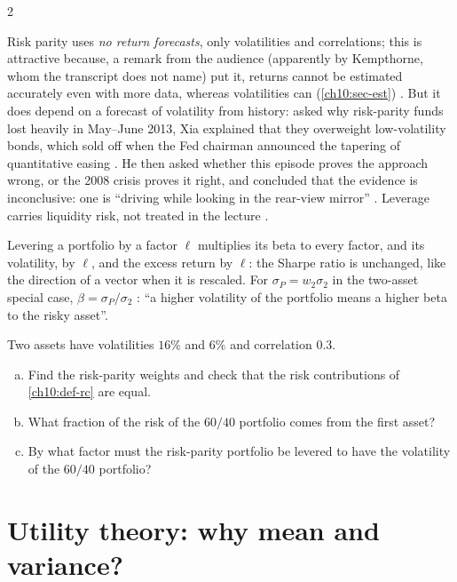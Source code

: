 \begin{paracol}{2}
\begin{finance}
Risk parity uses \emph{no return forecasts}, only volatilities and correlations; this is attractive because,
a remark from the audience (apparently by Kempthorne, whom the transcript does not name) put it, returns cannot be
estimated accurately even with more data, whereas volatilities can (\cref{ch10:sec-est}) . But it does depend on a forecast of volatility from history: asked why risk-parity
funds lost heavily in May--June 2013, Xia explained that they overweight low-volatility bonds, which sold off when
the Fed chairman announced the tapering of quantitative easing . He then asked whether this
episode proves the approach wrong, or the 2008 crisis proves it right, and concluded that the evidence is
inconclusive: one is ``driving while looking in the rear-view mirror''
. Leverage carries liquidity risk, not treated in the lecture .
\end{finance}

\begin{intuition}
Levering a portfolio by a factor $\ell$ multiplies its beta to every factor, and its volatility, by $\ell$, and
the excess return by $\ell$: the Sharpe ratio is unchanged, like the direction of a vector when it is rescaled.
For $\sigma_P=w_2\sigma_2$ in the two-asset special case, $\beta=\sigma_P/\sigma_2$
: ``a higher volatility of the portfolio means a higher beta to the risky asset''.
\end{intuition}

\begin{exercise}
Two assets have volatilities $16\%$ and $6\%$ and correlation $0.3$.
\begin{enumerate}[(a)]
  \item Find the risk-parity weights and check that the risk
      contributions of \cref{ch10:def-rc} are equal.
  \item What fraction of the risk of the $60/40$ portfolio comes from the first asset?
  \item By what factor must the
      risk-parity portfolio be levered to have the volatility of the $60/40$ portfolio?
\end{enumerate}
\end{exercise}

\section{Utility theory: why mean and variance?}\label{ch10:sec-utility}


\end{paracol}
